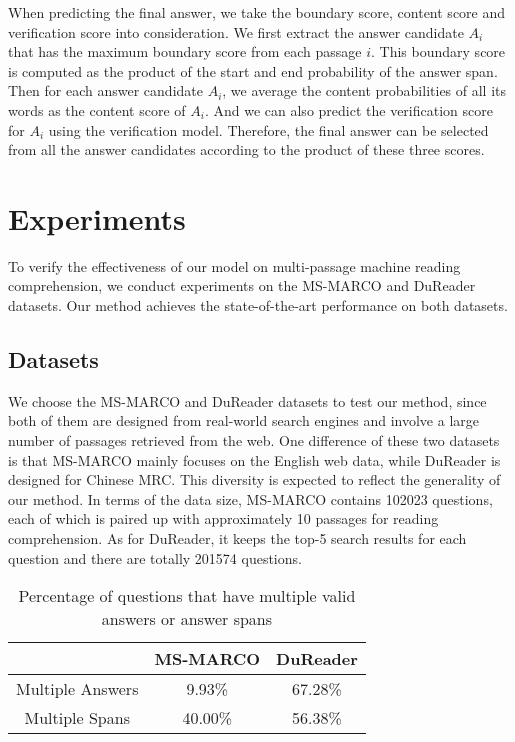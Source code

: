 \documentclass[11pt,a4paper]{article}
\begin{document}
When predicting the final answer, we take the boundary score, content score and verification score into consideration. 
We first extract the answer candidate $A_i$ that has the maximum boundary score from each passage $i$. This boundary score is computed as the product of the start and end probability of the answer span. Then for each answer candidate $A_i$, we average the content probabilities of all its words as the content score of $A_i$. And we can also predict the verification score for $A_i$ using the verification model. Therefore, the final answer can be selected from all the answer candidates according to the product of these three scores. 
  
\section{Experiments}
\label{experiments}

To verify the effectiveness of our model on multi-passage machine reading comprehension,
we conduct experiments on the MS-MARCO \cite{marco} and DuReader \cite{dureader} datasets. Our method achieves the state-of-the-art performance on both datasets.



\subsection{Datasets}
We choose the MS-MARCO and DuReader datasets to test our method, since both of them are designed from real-world search engines and involve a large number of passages retrieved from the web. One difference of these two datasets is that MS-MARCO mainly focuses on the English web data, while DuReader is designed for Chinese MRC. This diversity is expected to reflect the generality of our method. In terms of the data size, MS-MARCO contains 102023 questions, each of which is paired up with approximately 10 passages for reading comprehension. As for DuReader, it keeps the top-5 search results for each question and there are totally 201574 questions.  




\begin{table}[tbp]
\centering
\begin{tabular}{|c|c|c|}
\hline
                          & MS-MARCO & DuReader \\ \hline
Multiple Answers          &   9.93\%       &  67.28\%        \\
Multiple Spans &    40.00\%      &  56.38\%  \\\hline
\end{tabular}
\caption{Percentage of questions that have multiple valid answers or answer spans}
\label{tab:multi-answer}
\end{table}
\end{document}
